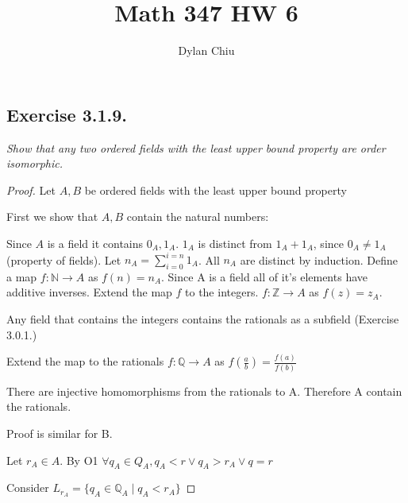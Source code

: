 \documentclass[12pt, a4paper]{article}
\title{Math 347 HW 6}
\author{Dylan Chiu}
\begin{document}
    \maketitle
    \subsection*{Exercise 3.1.9.}
        \textit{Show that any two ordered fields with the least upper bound
        property are order isomorphic.}
        \begin{proof}
            
            Let $A,B$ be ordered fields with the least upper bound property
            
            First we show that $A,B$ contain the natural numbers:
            
            Since $A$ is a field it contains $0_A, 1_A.$
            $1_A$ is distinct from $1_A+1_A$, since $0_A \not= 1_A$ (property of fields).
            Let $n_A=\sum_{i=0}^{i=n}{1_A}$. All $n_A$ are distinct by induction.
            Define a map $f: \mathbb{N} \rightarrow A$ as $f(n)=n_A$.
            Since A is a field all of it's elements have additive inverses. Extend the map $f$ to the integers.
            $f: \mathbb{Z} \rightarrow A$ as $f(z)=z_A$.
            
            Any field that contains the integers contains the rationals as a subfield (Exercise 3.0.1.)

            Extend the map to the rationals $f: \mathbb{Q} \rightarrow A$ as $f(\frac{a}{b})=\frac{f(a)}{f(b)}$

            There are injective homomorphisms from the rationals to A. Therefore A contain the rationals.

            Proof is similar for B. 

            Let $r_A\in A$. By O1 $\forall q_A\in Q_A, q_A < r \lor q_A > r_A \lor q = r $

            Consider $L_{r_A} = \{q_A \in \mathbb{Q}_A\mid q_A < r_A\}$


\end{proof}
\end{document}

